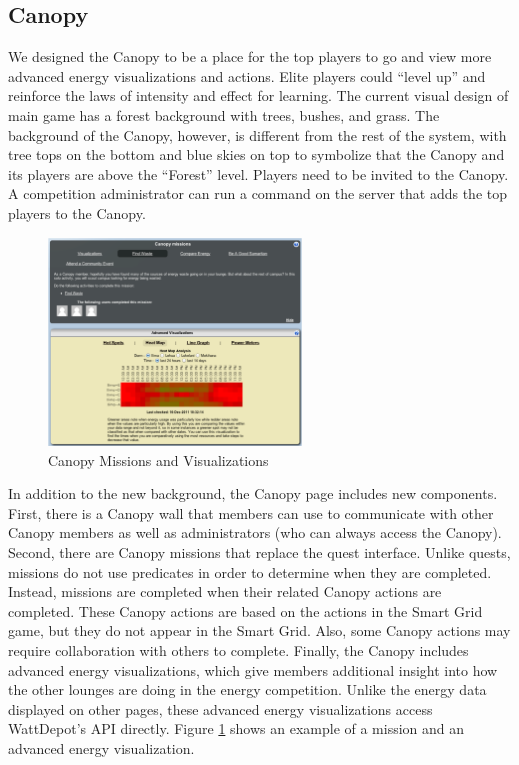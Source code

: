 \subsection{Canopy}
\label{makahiki:components-canopy}

We designed the Canopy to be a place for the top players to go and view
more advanced energy visualizations and actions. Elite players could ``level
up'' and reinforce the laws of intensity and effect for learning. The current visual design of
main game has a forest background with trees, bushes, and grass. The
background of the Canopy, however, is different from the rest of the
system, with tree tops on the bottom and blue skies on top to symbolize
that the Canopy and its players are above the ``Forest'' level. Players need to be invited
to the Canopy. A competition administrator can run a command on the server
that adds the top players to the Canopy.

\begin{figure}[ht!]
  \center
  \includegraphics[width=0.6\textwidth]{images/canopy-missions-visualizations.eps}
  \caption{Canopy Missions and Visualizations}
  \label{fig:CanopyMissions}
\end{figure}

In addition to the new background, the Canopy page includes new components. First, there is a Canopy wall that members can use to communicate with other Canopy members as well as administrators (who can always access the Canopy). Second, there are Canopy missions that replace the quest interface. Unlike quests, missions do not use predicates in order to determine when they are completed. Instead, missions are completed when their related Canopy actions are completed. These Canopy actions are based on the actions in the Smart Grid game, but they do not appear in the Smart Grid. Also, some Canopy actions may require collaboration with others to complete. Finally, the Canopy includes advanced energy visualizations, which give members additional insight into how the other lounges are doing in the energy competition. Unlike the energy data displayed on other pages, these advanced energy visualizations access WattDepot's API directly. Figure \ref{fig:CanopyMissions} shows an example of a mission and an advanced energy visualization.

